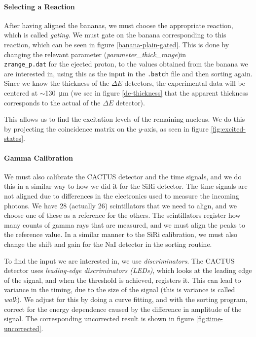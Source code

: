 \documentclass[a4paper,12pt]{article}
\begin{document}
\paragraph{Selecting a Reaction}
After having aligned the bananas, 
we must choose the appropriate reaction, which is
called \textit{gating}.
We must gate on the banana corresponding to
this reaction, which can be seen in figure \ref{banana-plain-gated}.
This is done by changing the relevant parameter
(\textit{parameter_thick_range})in \\
\verb+zrange_p.dat+ for the ejected proton,
to the values obtained from the banana we are interested in,
using this as the input in the \verb+.batch+ file
and then sorting again.
Since we know the thickness of the $\Delta E$ detectors,
the experimental data will be centered at $\sim$\SI{130}{\micro\meter}
(we see in figure \ref{de-thickness} that the apparent thickness
corresponds to the actual of the $\Delta E$ detector).

This allows us to find the excitation levels of
the remaining nucleus. We do this by
projecting the coincidence matrix on the $y$-axis,
as seen in figure \ref{fig:excited-states}.

\paragraph{Gamma Calibration}
We must also calibrate the CACTUS detector and the time signals,
and we do this in a similar way to how we did it for the
SiRi detector.
The time signals are not aligned due to differences in
the electronics used to measure the incoming photons.
We have 28 (actually 26) scintillators that we need to align,
and we choose one of these as a reference for the others.
The scintillators register how many counts of gamma rays
that are measured, and we must align the peaks to the reference value.
In a similar manner to the SiRi calibration, we must
also change the shift and gain for the NaI detector in the sorting routine.

To find the input we are interested in, we use \textit{discriminators}.
The CACTUS detector uses \textit{leading-edge discriminators (LEDs)},
which looks at the leading edge of the signal,
and when the threshold is achieved, registers it.
This can lead to variance in the timing, due to the size
of the signal (this is variance is called \textit{walk}).
We adjust for this by doing a curve fitting, and
with the sorting program, correct for the energy dependence
caused by the difference in amplitude of the signal.
The corresponding uncorrected result
is shown in figure \ref{fig:time-uncorrected}.
\end{document}
